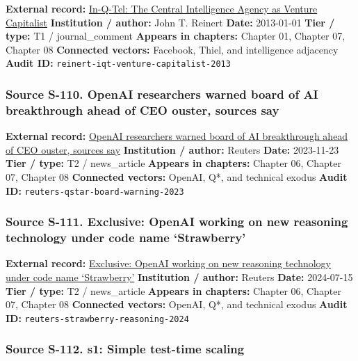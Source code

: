 \documentclass[
  american,
  11pt,
  letterpaper,
]{article}
\begin{document}
\textbf{External record:}
\href{https://scholarlycommons.law.northwestern.edu/njilb/vol33/iss3/4/}{In-Q-Tel:
The Central Intelligence Agency as Venture Capitalist}
\textbf{Institution / author:} John T. Reinert \textbf{Date:} 2013-01-01
\textbf{Tier / type:} T1 / journal\_comment \textbf{Appears in
chapters:} Chapter 01, Chapter 07, Chapter 08 \textbf{Connected
vectors:} Facebook, Thiel, and intelligence adjacency \textbf{Audit ID:}
\texttt{reinert-iqt-venture-capitalist-2013}

\subsubsection{Source S-110. OpenAI researchers warned board of AI
breakthrough ahead of CEO ouster, sources
say}\label{source-s-110-openai-researchers-warned-board-of-ai-breakthrough-ahead-of-ceo-ouster-sources-say}

\textbf{External record:}
\href{https://www.reuters.com/technology/sam-altmans-ouster-openai-was-precipitated-by-letter-board-about-ai-breakthrough-2023-11-22/}{OpenAI
researchers warned board of AI breakthrough ahead of CEO ouster, sources
say} \textbf{Institution / author:} Reuters \textbf{Date:} 2023-11-23
\textbf{Tier / type:} T2 / news\_article \textbf{Appears in chapters:}
Chapter 06, Chapter 07, Chapter 08 \textbf{Connected vectors:} OpenAI,
Q*, and technical exodus \textbf{Audit ID:}
\texttt{reuters-qstar-board-warning-2023}

\subsubsection{Source S-111. Exclusive: OpenAI working on new reasoning
technology under code name
`Strawberry'}\label{source-s-111-exclusive-openai-working-on-new-reasoning-technology-under-code-name-strawberry}

\textbf{External record:}
\href{https://www.reuters.com/technology/artificial-intelligence/openai-working-new-reasoning-technology-under-code-name-strawberry-2024-07-12/}{Exclusive:
OpenAI working on new reasoning technology under code name `Strawberry'}
\textbf{Institution / author:} Reuters \textbf{Date:} 2024-07-15
\textbf{Tier / type:} T2 / news\_article \textbf{Appears in chapters:}
Chapter 06, Chapter 07, Chapter 08 \textbf{Connected vectors:} OpenAI,
Q*, and technical exodus \textbf{Audit ID:}
\texttt{reuters-strawberry-reasoning-2024}

\subsubsection{Source S-112. s1: Simple test-time
scaling}\label{source-s-112-s1-simple-test-time-scaling}
\end{document}
